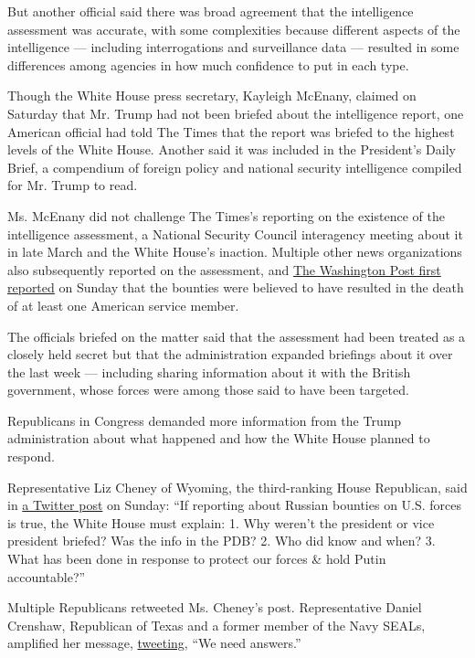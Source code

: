 But another official said there was broad agreement that the
intelligence assessment was accurate, with some complexities because
different aspects of the intelligence --- including interrogations and
surveillance data --- resulted in some differences among agencies in how
much confidence to put in each type.

Though the White House press secretary, Kayleigh McEnany, claimed on
Saturday that Mr. Trump had not been briefed about the intelligence
report, one American official had told The Times that the report was
briefed to the highest levels of the White House. Another said it was
included in the President's Daily Brief, a compendium of foreign policy
and national security intelligence compiled for Mr. Trump to read.

Ms. McEnany did not challenge The Times's reporting on the existence of
the intelligence assessment, a National Security Council interagency
meeting about it in late March and the White House's inaction. Multiple
other news organizations also subsequently reported on the assessment,
and
\href{https://www.washingtonpost.com/national-security/russian-bounties-to-taliban-linked-militants-resulted-in-deaths-of-us-troops-according-to-intelligence-assessments/2020/06/28/74ffaec2-b96a-11ea-80b9-40ece9a701dc_story.html}{The
Washington Post first reported} on Sunday that the bounties were
believed to have resulted in the death of at least one American service
member.

The officials briefed on the matter said that the assessment had been
treated as a closely held secret but that the administration expanded
briefings about it over the last week --- including sharing information
about it with the British government, whose forces were among those said
to have been targeted.

Republicans in Congress demanded more information from the Trump
administration about what happened and how the White House planned to
respond.

Representative Liz Cheney of Wyoming, the third-ranking House
Republican, said in
\href{https://twitter.com/Liz_Cheney/status/1277200077724037122}{a
Twitter post} on Sunday: ``If reporting about Russian bounties on U.S.
forces is true, the White House must explain: 1. Why weren't the
president or vice president briefed? Was the info in the PDB? 2. Who did
know and when? 3. What has been done in response to protect our forces
\& hold Putin accountable?''

Multiple Republicans retweeted Ms. Cheney's post. Representative Daniel
Crenshaw, Republican of Texas and a former member of the Navy SEALs,
amplified her message,
\href{https://twitter.com/RepDanCrenshaw/status/1277258533776568321}{tweeting},
``We need answers.''

